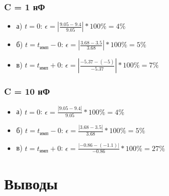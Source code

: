 \subsubsection{C = 1 нФ}
\begin{itemize}
\item[] а) $t = 0$: $\epsilon = |\frac{9.05 - 9.4}{ 9.05 }| * 100\% = 4 \%$

\item[] б) $t = t_\text{имп} - 0$: $\epsilon = |\frac{3.68 - 3.5}{ 3.68 }| * 100\% = 5 \%$

\item[] в) $t = t_\text{имп} + 0$: $\epsilon = |\frac{-5.37 - (-5)}{ -5.37 }| * 100\% = 7 \%$
\end{itemize}

\subsubsection{C = 10 нФ}
\begin{itemize}
\item[] а) $t = 0$: $\epsilon = \frac{| 9.05 - 9.4 |}{ 9.05 } * 100\% = 4 \%$

\item[] б) $t = t_\text{имп} - 0$: $\epsilon = \frac{| 3.68 - 3.5 |}{ 3.68 } * 100\% = 5 \%$

\item[] в) $t = t_\text{имп} + 0$: $\epsilon = \frac{| -0.86 - (-1.1) |}{ -0.86 } * 100\% = 27 \%$
\end{itemize}



  
\section{Выводы}




